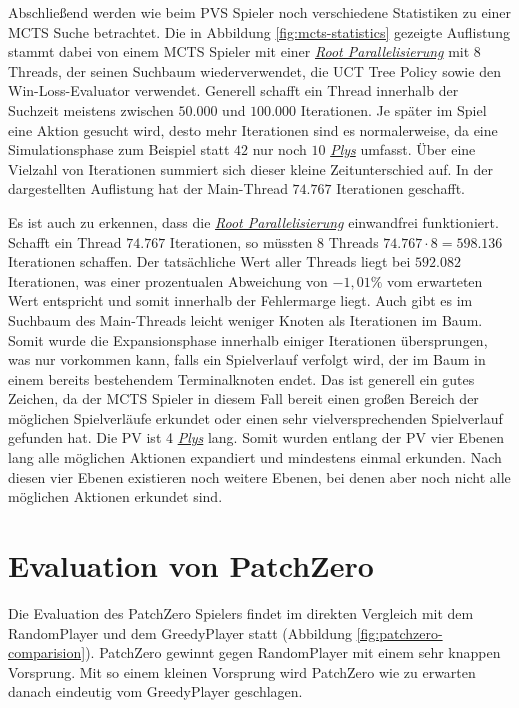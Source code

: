 Abschließend werden wie beim \ac{PVS} Spieler noch verschiedene Statistiken zu einer \ac{MCTS} Suche betrachtet. Die in Abbildung \ref{fig:mcts-statistics} gezeigte Auflistung stammt dabei von einem \ac{MCTS} Spieler mit einer \hyperref[text:root-parallelization]{\emph{Root Parallelisierung}} mit 8 Threads, der seinen Suchbaum wiederverwendet, die \ac{UCT} Tree Policy sowie den Win-Loss-Evaluator verwendet. Generell schafft ein Thread innerhalb der Suchzeit meistens zwischen $50{.}000$ und $100{.}000$ Iterationen. Je später im Spiel eine Aktion gesucht wird, desto mehr Iterationen sind es normalerweise, da eine Simulationsphase zum Beispiel statt $42$ nur noch $10$ \hyperref[text:ply]{\emph{Plys}} umfasst. Über eine Vielzahl von Iterationen summiert sich dieser kleine Zeitunterschied auf. In der dargestellten Auflistung hat der Main-Thread $74{.}767$ Iterationen geschafft.

Es ist auch zu erkennen, dass die \hyperref[text:root-parallelization]{\emph{Root Parallelisierung}} einwandfrei funktioniert. Schafft ein Thread $74{.}767$ Iterationen, so müssten 8 Threads $74{.}767 \cdot 8 = 598{.}136$ Iterationen schaffen. Der tatsächliche Wert aller Threads liegt bei $592{.}082$ Iterationen, was einer prozentualen Abweichung von $-1{,}01\%$ vom erwarteten Wert entspricht und somit innerhalb der Fehlermarge liegt. Auch gibt es im Suchbaum des Main-Threads leicht weniger Knoten als Iterationen im Baum. Somit wurde die Expansionsphase innerhalb einiger Iterationen übersprungen, was nur vorkommen kann, falls ein Spielverlauf verfolgt wird, der im Baum in einem bereits bestehendem Terminalknoten endet. Das ist generell ein gutes Zeichen, da der \ac{MCTS} Spieler in diesem Fall bereit einen großen Bereich der möglichen Spielverläufe erkundet oder einen sehr vielversprechenden Spielverlauf gefunden hat. Die \acl{PV} ist 4 \hyperref[text:ply]{\emph{Plys}} lang. Somit wurden entlang der \ac{PV} vier Ebenen lang alle möglichen Aktionen expandiert und mindestens einmal erkunden. Nach diesen vier Ebenen existieren noch weitere Ebenen, bei denen aber noch nicht alle möglichen Aktionen erkundet sind.

\section{Evaluation von PatchZero}

Die Evaluation des PatchZero Spielers findet im direkten Vergleich mit dem RandomPlayer und dem GreedyPlayer statt (Abbildung \ref{fig:patchzero-comparision}). PatchZero gewinnt gegen RandomPlayer mit einem sehr knappen Vorsprung. Mit so einem kleinen Vorsprung wird PatchZero wie zu erwarten danach eindeutig vom GreedyPlayer geschlagen.

